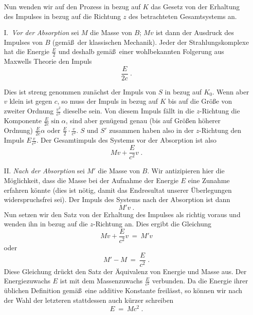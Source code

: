 Nun wenden wir auf den Prozess in bezug auf $K$ das Gesetz von der
Erhaltung des Impulses in bezug auf die Richtung $z$ des
betrachteten Gesamtsystems an.

I.\ {\it Vor der Absorption} sei $M$ die Masse von $B$; $Mv$ ist dann der
Ausdruck des Impulses von $B$ (gem\"a\ss\ der klassischen Mechanik). Jeder
der Strahlungskomplexe hat die Energie $\frac{E}{2}$ und deshalb 
gem\"a\ss\ einer wohlbekannten Folgerung aus Maxwells Theorie den
Impuls 
\begin{equation}
        \frac{E}{2c}  \;.  
\end{equation}
        
Dies ist streng genommen zun\"achst der Impuls von $S$ in bezug auf
$K_0$. Wenn aber $v$ klein ist gegen $c$, so muss der Impuls in 
bezug auf $K$ bis auf die Gr\"o\ss e von zweiter Ordnung $\frac{v^2}{c^2}$
dieselbe sein. Von diesem Impuls f\"allt in die $z$-Richtung
die Komponente $\frac{E}{2c}\sin \alpha$, sind aber gen\"ugend genau
(bis auf Gr\"o\ss en h\"oherer Ordnung) $\frac{E}{2c}\alpha$ oder
$\frac{E}{2}\cdot \frac{v}{c^2}$. $S$ und $S'$ zusammen haben also in
der $z$-Richtung den Impuls $E \frac{v}{c^2}$. Der Gesamtimpuls des
Systems vor der Absorption ist also
\begin{equation}
          Mv + \frac{E}{c^2} v   \;.   
\end{equation}
          
II. {\it Nach der Absorption} sei $M'$ die Masse von $B$. Wir
antizipieren hier die M\"oglichkeit, dass die Masse bei der Aufnahme
der Energie $E$ eine Zunahme erfahren k\"onnte (dies ist n\"otig, damit
das Endresultat unserer \"Uberlegungen widerspruchsfrei sei). Der
Impuls des Systems nach der Absorption ist dann
\begin{equation}
      M' v  \;. 
\end{equation}      
Nun setzen wir den Satz von der Erhaltung des Impulses als richtig
voraus und wenden ihn in bezug auf die $z$-Richtung an. Dies ergibt
die Gleichung
\begin{equation}
       Mv + \frac{E}{c^2} v ~=~ M' v   
\end{equation}
oder 
\begin{equation}
       M' - M ~=~ \frac{E}{c^2}   \;.   
\end{equation}      
Diese Gleichung dr\"uckt den Satz der \"Aquivalenz von Energie und
Masse aus. Der Energiezuwachs $E$ ist mit dem Massenzuwachs 
$\frac{E}{c^2}$ verbunden. Da die Energie ihrer \"ublichen Definition
gem\"a\ss\ eine additive Konstante freil\"asst, so k\"onnen wir nach
der Wahl der letzteren stattdessen auch k\"urzer schreiben
\begin{equation}
        E ~=~ M c^2    \;.    
\end{equation}

